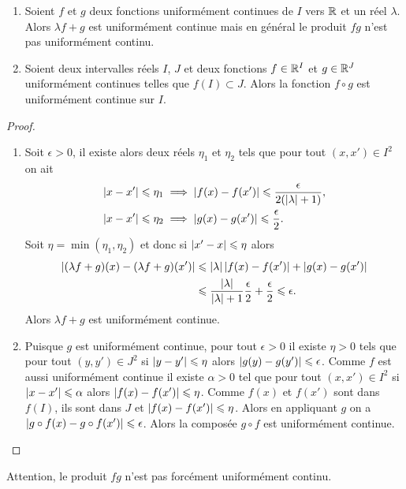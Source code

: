 \begin{prop}
  \begin{enumerate}
    \item Soient \(f\) et \(g\) deux fonctions uniformément continues de \(I\) 
      vers \(\mathbb{R}\) et un réel \(\lambda\). Alors \(\lambda f +g\) est 
      uniformément continue mais en général le produit \(fg\) n'est pas 
      uniformément continu.
    \item Soient deux intervalles réels \(I\), \(J\) et deux fonctions \(f \in 
      \mathbb{R}^I\) et \(g\in \mathbb{R}^J\) uniformément continues telles que \(f(I)\subset 
      J\). Alors la fonction \(f \circ g\) est uniformément continue sur \(I\).
  \end{enumerate}
\end{prop}
\begin{proof}
  \begin{enumerate}
    \item Soit \(\epsilon >0\), il existe alors deux réels \(\eta_1\) et 
      \(\eta_2\) tels que pour tout \((x,x') \in I^2\) on ait
      \begin{align}
        \left\lvert x-x'\right\rvert \leqslant \eta_1 &\implies \left\lvert f(x)-f(x')\right\rvert \leqslant 
        \frac{\epsilon}{2(\left\lvert\lambda\right\rvert+1)},\\
        \left\lvert x-x'\right\rvert \leqslant \eta_2 &\implies \left\lvert g(x)-g(x')\right\rvert \leqslant 
        \frac{\epsilon}{2}.
      \end{align}
      Soit \(\eta=\min(\eta_1,\eta_2)\) et donc si \(\left\lvert x'-x\right\rvert \leqslant \eta\) 
      alors \begin{align}
        \left\lvert(\lambda f+g)(x)-(\lambda f+g)(x')\right\rvert &\leqslant \left\lvert\lambda\right\rvert 
        \left\lvert f(x)-f(x')\right\rvert + \left\lvert g(x)-g(x')\right\rvert \\
        &\leqslant \frac{\left\lvert\lambda\right\rvert}{\left\lvert\lambda\right\rvert +1} 
        \frac{\epsilon}{2}+\frac{\epsilon}{2} \leqslant \epsilon.
      \end{align}
      Alors \(\lambda f+g\) est uniformément continue.
    \item Puisque \(g\) est uniformément continue, pour tout \(\epsilon >0\) il 
      existe \(\eta >0\) tels que pour tout \((y,y') \in J^2\) si \(\left\lvert y-y'\right\rvert 
      \leqslant \eta\) alors \(\left\lvert g(y)-g(y')\right\rvert \leqslant \epsilon\). Comme 
      \(f\) est aussi uniformément continue il existe \(\alpha >0\) tel que pour 
      tout \((x,x') \in I^2\) si \(\left\lvert x-x'\right\rvert \leqslant \alpha\) alors 
      \(\left\lvert f(x)-f(x')\right\rvert \leqslant \eta\). Comme \(f(x)\) et \(f(x')\) sont dans 
      \(f(I)\), ils sont dans \(J\) et \(\left\lvert f(x)-f(x')\right\rvert \leqslant \eta\). 
      Alors en appliquant \(g\) on a \(\left\lvert g \circ f(x)-g \circ f(x')\right\rvert 
      \leqslant \epsilon\). Alors la composée \(g \circ f\) est uniformément 
      continue.
  \end{enumerate}
\end{proof}
Attention, le produit \(fg\) n'est pas forcément uniformément continu.

